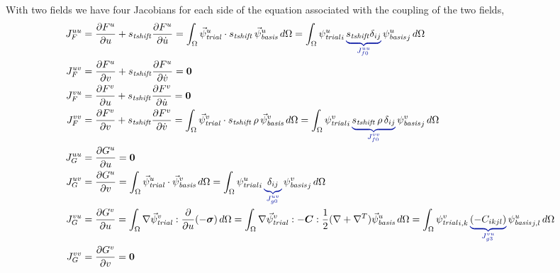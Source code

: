 With two fields we have four Jacobians for each side of the equation associated with the 
coupling of the two 
fields,
\begin{align}
  J_F^{uu} &= \frac{\partial F^u}{\partial u} + s_\mathit{tshift} \frac{\partial F^u}{\partial 
\dot{u}} = \int_\Omega 
\trialvec[u] \cdot s_\mathit{tshift}\,\basisvec[u] \, d\Omega = \int_\Omega \trialscalar[u]_i 
\, 
\eqnannotate{s_\mathit{tshift} \delta_{ij}}{J_{f0}^{uu}} \, \basisscalar[u]_j \, d\Omega \\
  J_F^{uv} &= \frac{\partial F^u}{\partial v} + s_\mathit{tshift} \frac{\partial F^u}{\partial 
\dot{v}} = \tensor{0} \\
  J_F^{vu} &= \frac{\partial F^v}{\partial u} + s_\mathit{tshift} \frac{\partial F^v}{\partial 
\dot{u}} = \tensor{0} \\
  J_F^{vv} &= \frac{\partial F^v}{\partial v} + s_\mathit{tshift} \frac{\partial F^v}{\partial 
\dot{v}} = \int_\Omega 
\trialvec[v] \cdot s_\mathit{tshift}\,\rho\,\basisvec[v] \, d\Omega = \int_\Omega 
\trialscalar[v]_i \, 
\eqnannotate{s_\mathit{tshift} \, \rho \, \delta_{ij}}{J_{f0}^{vv}} \, \basisscalar[v]_j \, 
d\Omega \\
  J_G^{uu} &= \frac{\partial G^u}{\partial u} = \tensor{0} \\
  J_G^{uv} &= \frac{\partial G^u}{\partial v} = \int_\Omega \trialvec[u] \cdot \basisvec[v] \, 
d\Omega = 
\int_\Omega \trialscalar[u]_i \, \eqnannotate{\delta_{ij}}{J_{g0}^{uv}} \, \basisscalar[v]_j 
\, d\Omega \\
  J_G^{vu} &= \frac{\partial G^v}{\partial u} = \int_\Omega \nabla \trialvec[v] : 
\frac{\partial}{\partial u}(-
\tensor{\sigma}) \, d\Omega 
  = \int_\Omega \nabla \trialvec[v] : -\tensor{C} : \frac{1}{2}(\nabla + \nabla^T)\basisvec[u] 
\, d\Omega 
  = \int_\Omega \trialscalar[v]_{i,k} \, \eqnannotate{\left( -C_{ikjl} \right)}{J_{g3}^{vu}}  
\, 
\basisscalar[u]_{j,l}\, d\Omega \\
  J_G^{vv} &= \frac{\partial G^v}{\partial v} = \tensor{0}
\end{align}

